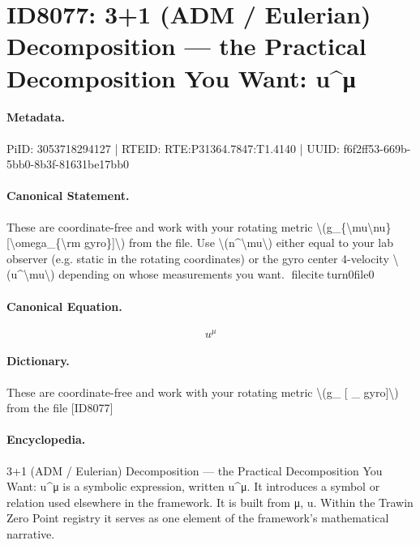 \section*{ID8077: 3+1 (ADM / Eulerian) Decomposition — the Practical Decomposition You Want: u\textasciicircum{}μ}
\paragraph{Metadata.}
PiID: 3053718294127 | RTEID: RTE:P31364.7847:T1.4140 | UUID: f6f2ff53-669b-5bb0-8b3f-81631be17bb0

\paragraph{Canonical Statement.}
These are coordinate-free and work with your rotating metric \textbackslash{}(g\_\{\textbackslash{}mu\textbackslash{}nu\}[\textbackslash{}omega\_\{\textbackslash{}rm gyro\}]\textbackslash{}) from the file. Use \textbackslash{}(n\textasciicircum{}\textbackslash{}mu\textbackslash{}) either equal to your lab observer (e.g. static in the rotating coordinates) or the gyro center 4-velocity \textbackslash{}(u\textasciicircum{}\textbackslash{}mu\textbackslash{}) depending on whose measurements you want. fileciteturn0file0

\paragraph{Canonical Equation.}
\[
u^\mu
\]

\paragraph{Dictionary.}
These are coordinate-free and work with your rotating metric \textbackslash{}(g\_ [ \_ gyro]\textbackslash{}) from the file [ID8077]

\paragraph{Encyclopedia.}
3+1 (ADM / Eulerian) Decomposition — the Practical Decomposition You Want: u\textasciicircum{}μ is a symbolic expression, written u\textasciicircum{}μ. It introduces a symbol or relation used elsewhere in the framework. It is built from μ, u. Within the Trawin Zero Point registry it serves as one element of the framework's mathematical narrative.
